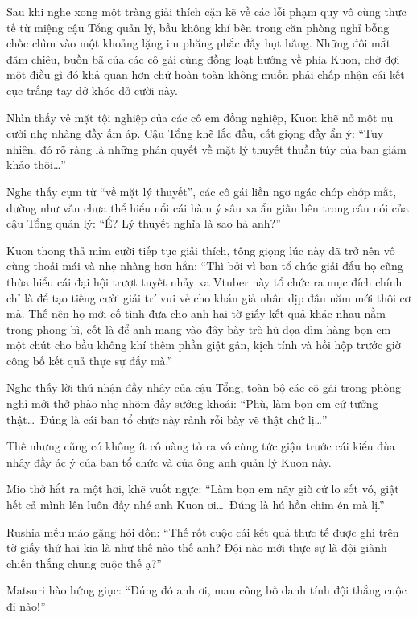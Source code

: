\documentclass[../main.tex]{subfiles}
\begin{document}
Sau khi nghe xong một tràng giải thích cặn kẽ về các lỗi phạm quy vô cùng thực tế từ miệng cậu Tổng quản lý, bầu không khí bên trong căn phòng nghỉ bỗng chốc chìm vào một khoảng lặng im phăng phắc đầy hụt hẫng. Những đôi mắt đăm chiêu, buồn bã của các cô gái cùng đồng loạt hướng về phía Kuon, chờ đợi một điều gì đó khả quan hơn chứ hoàn toàn không muốn phải chấp nhận cái kết cục trắng tay dở khóc dở cười này.

Nhìn thấy vẻ mặt tội nghiệp của các cô em đồng nghiệp, Kuon khẽ nở một nụ cười nhẹ nhàng đầy ấm áp. Cậu Tổng khẽ lắc đầu, cất giọng đầy ẩn ý: ``Tuy nhiên, đó rõ ràng là những phán quyết về mặt lý thuyết thuần túy của ban giám khảo thôi\dots''

Nghe thấy cụm từ ``về mặt lý thuyết'', các cô gái liền ngơ ngác chớp chớp mắt, dường như vẫn chưa thể hiểu nổi cái hàm ý sâu xa ẩn giấu bên trong câu nói của cậu Tổng quản lý: ``Ể? Lý thuyết nghĩa là sao hả anh?''

Kuon thong thả mỉm cười tiếp tục giải thích, tông giọng lúc này đã trở nên vô cùng thoải mái và nhẹ nhàng hơn hẳn: ``Thì bởi vì ban tổ chức giải đấu họ cũng thừa hiểu cái đại hội trượt tuyết nhảy xa Vtuber này tổ chức ra mục đích chính chỉ là để tạo tiếng cười giải trí vui vẻ cho khán giả nhân dịp đầu năm mới thôi cơ mà. Thế nên họ mới cố tình đưa cho anh hai tờ giấy kết quả khác nhau nằm trong phong bì, cốt là để anh mang vào đây bày trò hù dọa dìm hàng bọn em một chút cho bầu không khí thêm phần giật gân, kịch tính và hồi hộp trước giờ công bố kết quả thực sự đấy mà.''

Nghe thấy lời thú nhận đầy nhây của cậu Tổng, toàn bộ các cô gái trong phòng nghỉ mới thở phào nhẹ nhõm đầy sướng khoái: ``Phù, làm bọn em cứ tưởng thật\dots\ Đúng là cái ban tổ chức này rảnh rỗi bày vẽ thật chứ lị\dots''

Thế nhưng cũng có không ít cô nàng tỏ ra vô cùng tức giận trước cái kiểu đùa nhây đầy ác ý của ban tổ chức và của ông anh quản lý Kuon này.

Mio thở hắt ra một hơi, khẽ vuốt ngực: ``Làm bọn em nãy giờ cứ lo sốt vó, giật hết cả mình lên luôn đấy nhé anh Kuon ơi\dots\ Đúng là hú hồn chim én mà lị.''

Rushia mếu máo gặng hỏi dồn: ``Thế rốt cuộc cái kết quả thực tế được ghi trên tờ giấy thứ hai kia là như thế nào thế anh? Đội nào mới thực sự là đội giành chiến thắng chung cuộc thế ạ?''

Matsuri hào hứng giục: ``Đúng đó anh ơi, mau công bố danh tính đội thắng cuộc đi nào!''
\end{document}
